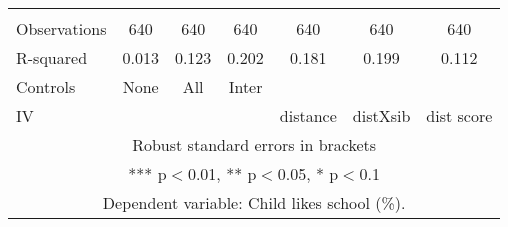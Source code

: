 \begin{tabular}{lcccccc}
 &  &  &  &  &  &  \\
Observations & 640 & 640 & 640 & 640 & 640 & 640 \\
R-squared & 0.013 & 0.123 & 0.202 & 0.181 & 0.199 & 0.112 \\
Controls & None & All & Inter &  &  &  \\
 IV &  &  &  & distance & distXsib & dist score \\ \hline
\multicolumn{7}{c}{ Robust standard errors in brackets} \\
\multicolumn{7}{c}{ *** p$<$0.01, ** p$<$0.05, * p$<$0.1} \\
\multicolumn{7}{c}{ Dependent variable: Child likes school (\%).} \\
\end{tabular}
